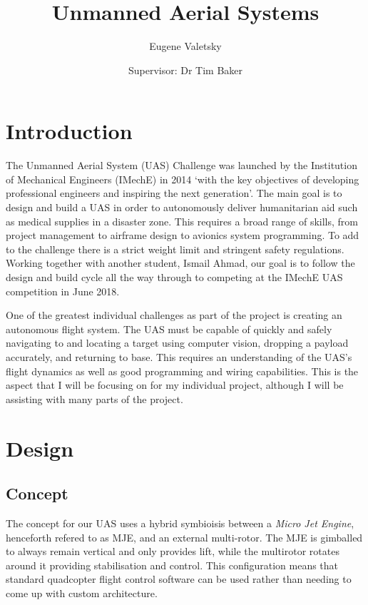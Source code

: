 \documentclass[11pt]{article}
\author{Eugene Valetsky\\ \and Supervisor: Dr Tim Baker}
\title{Unmanned Aerial Systems}
\begin{document}
\maketitle
\tableofcontents
\newpage



\section{Introduction}
The Unmanned Aerial System (UAS) Challenge was launched by the Institution of Mechanical Engineers (IMechE) in 2014 `with the key objectives of developing professional engineers and inspiring the next generation'\cite{IMechE_about_uas}. The main goal is to design and build a UAS in order to autonomously deliver humanitarian aid such as medical supplies in a disaster zone. This requires a broad range of skills, from project management to airframe design to avionics system programming. To add to the challenge there is a strict weight limit and stringent safety regulations. Working together with another student, Ismail Ahmad, our goal is to follow the design and build cycle all the way through to competing at the IMechE UAS competition in June 2018.

One of the greatest individual challenges as part of the project is creating an autonomous flight system. The UAS must be capable of quickly and safely navigating to and locating a target using computer vision, dropping a payload accurately, and returning to base. This requires an understanding of the UAS’s flight dynamics as well as good programming and wiring capabilities. This is the aspect that I will be focusing on for my individual project, although I will be assisting with many parts of the project.

\section{Design}
\subsection{Concept}
The concept for our UAS uses a hybrid symbioisis between a \emph{Micro Jet Engine}, henceforth refered to as MJE, and an external multi-rotor. The MJE is gimballed to always remain vertical and only provides lift, while the multirotor rotates around it providing stabilisation and control. This configuration means that standard quadcopter flight control software can be used rather than needing to come up with custom architecture.
\end{document}
